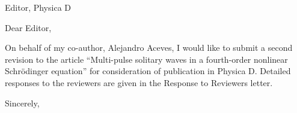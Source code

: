 \documentclass[11pt]{letter}
\begin{document}
\address{Ross Parker \\
Department of Mathematics \\
Southern Methodist University \\
Dallas, TX 75275 \\
\texttt{rhparker@smu.edu}}%
\signature{Ross Parker}
\begin{letter}{Editor, Physica D}

\opening{Dear Editor,}

On behalf of my co-author, Alejandro Aceves, I would like to submit a second revision to the article ``Multi-pulse solitary waves in a fourth-order nonlinear {S}chr{\"o}dinger equation'' for consideration of publication in Physica D. Detailed responses to the reviewers are given in the Response to Reviewers letter.

\closing{Sincerely,}

\end{letter}
\end{document}
